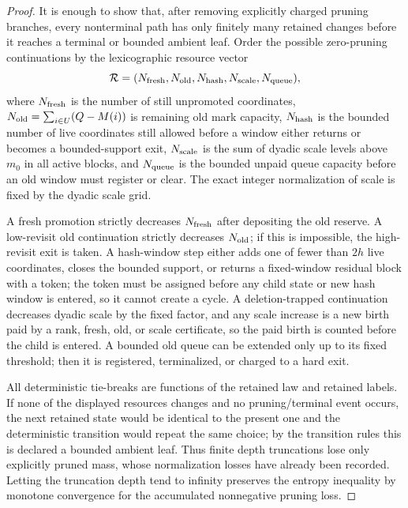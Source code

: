 \documentclass[11pt]{article}
\theoremstyle{remark}
\begin{document}
\begin{proof}
It is enough to show that, after removing explicitly charged pruning branches, every nonterminal path has only finitely many retained changes before it reaches a terminal or bounded ambient leaf.  Order the possible zero-pruning continuations by the lexicographic resource vector
\[
        \mathcal R=(N_{\rm fresh},N_{\rm old},N_{\rm hash},N_{\rm scale},N_{\rm queue}),
\]
where $N_{\rm fresh}$ is the number of still unpromoted coordinates, $N_{\rm old}=\sum_{i\in U}(Q-M(i))$ is remaining old mark capacity, $N_{\rm hash}$ is the bounded number of live coordinates still allowed before a window either returns or becomes a bounded-support exit, $N_{\rm scale}$ is the sum of dyadic scale levels above $m_0$ in all active blocks, and $N_{\rm queue}$ is the bounded unpaid queue capacity before an old window must register or clear.  The exact integer normalization of scale is fixed by the dyadic scale grid.

A fresh promotion strictly decreases $N_{\rm fresh}$ after depositing the old reserve.  A low-revisit old continuation strictly decreases $N_{\rm old}$; if this is impossible, the high-revisit exit is taken.  A hash-window step either adds one of fewer than $2h$ live coordinates, closes the bounded support, or returns a fixed-window residual block with a token; the token must be assigned before any child state or new hash window is entered, so it cannot create a cycle.  A deletion-trapped continuation decreases dyadic scale by the fixed factor, and any scale increase is a new birth paid by a rank, fresh, old, or scale certificate, so the paid birth is counted before the child is entered.  A bounded old queue can be extended only up to its fixed threshold; then it is registered, terminalized, or charged to a hard exit.

All deterministic tie-breaks are functions of the retained law and retained labels.  If none of the displayed resources changes and no pruning/terminal event occurs, the next retained state would be identical to the present one and the deterministic transition would repeat the same choice; by the transition rules this is declared a bounded ambient leaf.  Thus finite depth truncations lose only explicitly pruned mass, whose normalization losses have already been recorded.  Letting the truncation depth tend to infinity preserves the entropy inequality by monotone convergence for the accumulated nonnegative pruning loss.
\end{proof}
\end{document}
